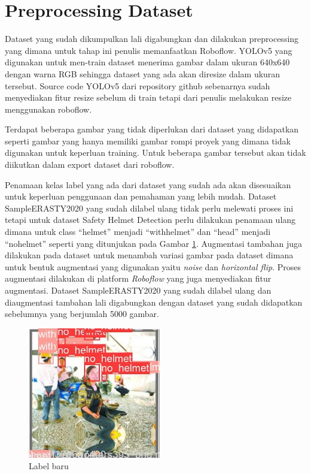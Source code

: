 \section{Preprocessing Dataset}
\label{sec:preprocessing}
Dataset yang sudah dikumpulkan lali digabungkan dan dilakukan preprocessing yang dimana untuk tahap ini penulis memanfaatkan Roboflow.
YOLOv5 yang digunakan untuk men-train dataset menerima gambar dalam ukuran 640x640 dengan warna RGB sehingga dataset yang ada akan diresize dalam ukuran tersebut. Source code YOLOv5 dari repository github sebenarnya sudah menyediakan fitur resize sebelum di train tetapi dari penulis melakukan resize menggunakan roboflow. 

Terdapat beberapa gambar yang tidak diperlukan dari dataset yang didapatkan seperti gambar yang hanya memiliki gambar rompi proyek yang dimana tidak digunakan untuk keperluan training. Untuk beberapa gambar tersebut akan tidak diikutkan dalam export dataset dari roboflow.

Penamaan kelas  label yang ada dari dataset yang sudah ada akan disesuaikan untuk keperluan penggunaan dan pemahaman yang lebih mudah. Dataset SampleERASTY2020 yang sudah dilabel ulang tidak perlu melewati proses ini tetapi untuk dataset Safety Helmet Detection perlu dilakukan penamaan ulang dimana untuk class “helmet” menjadi “with\textunderscore helmet” dan “head” menjadi “no\textunderscore helmet” seperti yang ditunjukan pada Gambar \ref{fig:labelbaru}. Augmentasi tambahan juga dilakukan pada dataset untuk menambah variasi gambar pada dataset dimana untuk bentuk augmentasi yang digunakan yaitu \emph{noise} dan \emph{horizontal flip}. Proses augmentasi dilakukan di platform \emph{Roboflow} yang juga menyediakan fitur augmentasi. Dataset SampleERASTY2020 yang sudah dilabel ulang dan diaugmentasi tambahan lali digabungkan dengan dataset yang sudah didapatkan sebelumnya yang berjumlah 5000 gambar. 

\begin{figure}[ht]
  \centering
  \includegraphics[scale=1]{gambar/Screenshot_86.png}
  \caption{Label baru}
  \label{fig:labelbaru}  
\end{figure}

